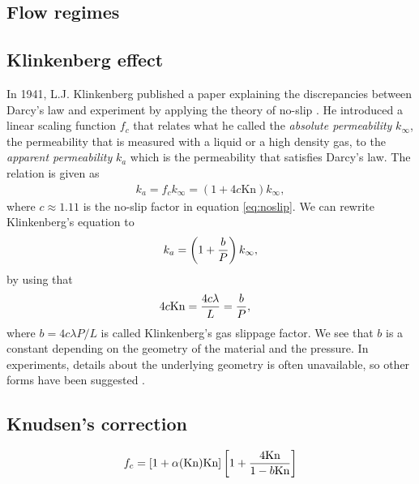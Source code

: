 \subsection{Flow regimes}


\subsection{Klinkenberg effect}
In 1941, L.J. Klinkenberg published a paper explaining the discrepancies between Darcy's law and experiment by applying the theory of no-slip \cite{klinkenberg1941permeability}. He introduced a linear scaling function $f_c$ that relates what he called the \textit{absolute permeability} $k_\infty$, the permeability that is measured with a liquid or a high density gas, to the \textit{apparent permeability} $k_a$ which is the permeability that satisfies Darcy's law. The relation is given as
\begin{align}
	k_a = f_c k_\infty = \left(1 + 4c\text{Kn}\right)k_\infty,
\end{align}
where $c\approx 1.11$ is the no-slip factor in equation \eqref{eq:noslip}. We can rewrite Klinkenberg's equation to 
\begin{align}
	k_a = \left(1 + {b\over P}\right)k_\infty,
\end{align}
by using that
\begin{align}
	4c\text{Kn} &= {4c\lambda \over L} = {b\over P},
\end{align}
where $b=4c\lambda P / L$ is called Klinkenberg's gas slippage factor. We see that $b$ is a constant depending on the geometry of the material and the pressure. In experiments, details about the underlying geometry is often unavailable, so other forms have been suggested \cite{ziarani2012knudsen}.
\subsection{Knudsen's correction}
\label{sec:knudsen_correction}
\begin{align}
	\label{eq:knudsen_correction}
	f_c = [1 + \alpha(\text{Kn})\text{Kn}]\left[1 + {4\text{Kn}\over 1 - b\text{Kn}}\right]
\end{align}
